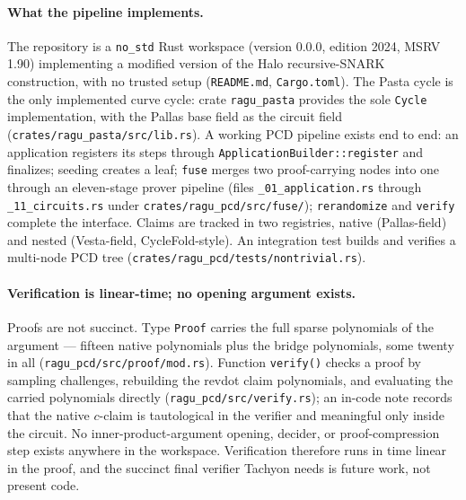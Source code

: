\documentclass[11pt,a4paper]{article}
\theoremstyle{definition}
\begin{document}
\paragraph{What the pipeline implements.}
The repository is a \texttt{no\_std} Rust workspace (version 0.0.0, edition
2024, MSRV 1.90) implementing a modified version of the Halo recursive-SNARK
construction, with no trusted setup (\texttt{README.md},
\texttt{Cargo.toml}). The Pasta cycle is the only implemented curve cycle:
crate \texttt{ragu\_pasta} provides the sole \texttt{Cycle} implementation,
with the Pallas base field as the circuit field
(\texttt{crates/ragu\_pasta/src/lib.rs}). A working PCD pipeline exists end
to end: an application registers its steps through
\texttt{ApplicationBuilder::register} and finalizes; seeding creates a leaf;
\texttt{fuse} merges two proof-carrying nodes into one through an
eleven-stage prover pipeline (files \texttt{\_01\_application.rs} through
\texttt{\_11\_circuits.rs} under \texttt{crates/ragu\_pcd/src/fuse/});
\texttt{rerandomize} and \texttt{verify} complete the interface. Claims are
tracked in two registries, native (Pallas-field) and nested (Vesta-field,
CycleFold-style). An integration test builds and verifies a multi-node PCD
tree (\texttt{crates/ragu\_pcd/tests/nontrivial.rs}).

\paragraph{Verification is linear-time; no opening argument exists.}
Proofs are not succinct. Type \texttt{Proof} carries the full sparse
polynomials of the argument --- fifteen native polynomials plus the bridge
polynomials, some twenty in all (\texttt{ragu\_pcd/src/proof/mod.rs}).
Function \texttt{verify()} checks a proof by sampling challenges, rebuilding
the revdot claim polynomials, and evaluating the carried polynomials
directly (\texttt{ragu\_pcd/src/verify.rs}); an in-code note records
that the native $c$-claim is tautological in the verifier and meaningful
only inside the circuit. No inner-product-argument opening, decider, or
proof-compression step exists anywhere in the workspace. Verification
therefore runs in time linear in the proof, and the succinct final verifier
Tachyon needs is future work, not present code.
\end{document}
